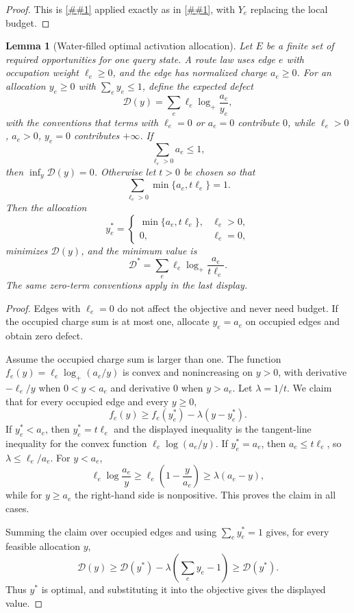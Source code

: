\documentclass[10pt]{article}
\newcommand{\cref}[1]{\ref{##1}}
\newtheorem{lemma}[theorem]{Lemma}
\theoremstyle{definition}
\begin{document}
\begin{proof}
   This is \cref{cor:typical-route-law-toll} applied exactly as in
   \cref{cor:canonical-budget-defect-toll}, with \(Y_e\) replacing the local
   budget.
\end{proof}

\begin{lemma}[Water-filled optimal activation allocation]
   \label{lem:waterfilled-allocation}
   Let \(E\) be a finite set of required opportunities for one query state.
   A route law uses edge \(e\) with occupation weight
   \(\ell_e\ge0\), and the edge has normalized charge \(a_e\ge0\).  For an
   allocation \(y_e\ge0\) with \(\sum_e y_e\le1\), define the expected defect
   \[
      \mathcal D(y)
      =
      \sum_e \ell_e\log_+\frac{a_e}{y_e},
   \]
   with the conventions that terms with \(\ell_e=0\) or \(a_e=0\) contribute
   \(0\), while \(\ell_e>0\), \(a_e>0\), \(y_e=0\) contributes \(+\infty\).
   If
   \[
      \sum_{\ell_e>0}a_e\le1,
   \]
   then \(\inf_y\mathcal D(y)=0\).  Otherwise let \(t>0\) be chosen so that
   \[
      \sum_{\ell_e>0}\min\{a_e,t\ell_e\}=1 .
   \]
   Then the allocation
   \[
      y_e^*=
      \begin{cases}
         \min\{a_e,t\ell_e\},&\ell_e>0,\\
         0,&\ell_e=0,
      \end{cases}
   \]
   minimizes \(\mathcal D(y)\), and the minimum value is
   \[
      \mathcal D^*
      =
      \sum_e \ell_e\log_+\frac{a_e}{t\ell_e}.
   \]
   The same zero-term conventions apply in the last display.
\end{lemma}

\begin{proof}
   Edges with \(\ell_e=0\) do not affect the objective and never need budget.
   If the occupied charge sum is at most one, allocate \(y_e=a_e\) on occupied
   edges and obtain zero defect.

   Assume the occupied charge sum is larger than one.  The function
   \(f_e(y)=\ell_e\log_+(a_e/y)\) is convex and nonincreasing on \(y>0\), with
   derivative \(-\ell_e/y\) when \(0<y<a_e\) and derivative \(0\) when
   \(y>a_e\).  Let \(\lambda=1/t\).  We claim that for every occupied edge and
   every \(y\ge0\),
   \[
      f_e(y)\ge f_e(y_e^*)-\lambda(y-y_e^*) .
   \]
   If \(y_e^*<a_e\), then \(y_e^*=t\ell_e\) and the displayed inequality is
   the tangent-line inequality for the convex function \(\ell_e\log(a_e/y)\).
   If \(y_e^*=a_e\), then \(a_e\le t\ell_e\), so \(\lambda\le\ell_e/a_e\).
   For \(y<a_e\),
   \[
      \ell_e\log\frac{a_e}{y}
      \ge
      \ell_e\left(1-\frac{y}{a_e}\right)
      \ge
      \lambda(a_e-y),
   \]
   while for \(y\ge a_e\) the right-hand side is nonpositive.  This proves the
   claim in all cases.

   Summing the claim over occupied edges and using
   \(\sum_e y_e^*=1\) gives, for every feasible allocation \(y\),
   \[
      \mathcal D(y)
      \ge
      \mathcal D(y^*)-\lambda\left(\sum_e y_e-1\right)
      \ge
      \mathcal D(y^*) .
   \]
   Thus \(y^*\) is optimal, and substituting it into the objective gives the
   displayed value.
\end{proof}
\end{document}
